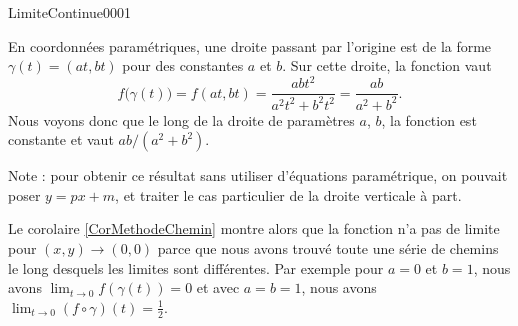 \begin{corrige}{LimiteContinue0001}

	En coordonnées paramétriques, une droite passant par l'origine est de la forme $\gamma(t)=(at,bt)$ pour des constantes $a$ et $b$. Sur cette droite, la fonction vaut
	\begin{equation}
		f\big( \gamma(t) \big)=f(at,bt)=\frac{ abt^2 }{ a^2t^2+b^2t^2 }=\frac{ ab }{ a^2+b^2 }.
	\end{equation}
	Nous voyons donc que le long de la droite de paramètres $a$, $b$, la fonction est constante et vaut $ab/(a^2+b^2)$.
	
	Note : pour obtenir ce résultat sans utiliser d'équations paramétrique, on pouvait poser $y=px+m$, et traiter le cas particulier de la droite verticale à part.

	Le corolaire \ref{CorMethodeChemin} montre alors que la fonction n'a pas de limite pour $(x,y)\to (0,0)$ parce que nous avons trouvé toute une série de chemins le long desquels les limites sont différentes. Par exemple pour $a=0$ et $b=1$, nous avons $\lim_{t\to 0} f(\gamma(t))=0$ et avec $a=b=1$, nous avons $\lim_{t\to 0} (f\circ\gamma)(t)=\frac{ 1 }{2}$.

\end{corrige}
